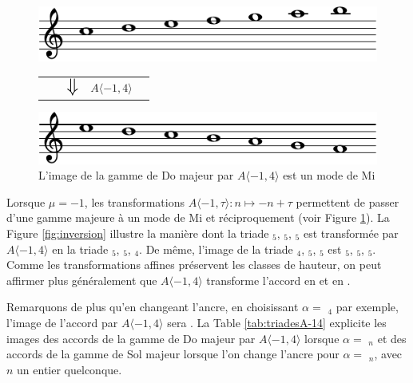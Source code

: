 \begin{figure}
  \includegraphics[width=\columnwidth]{c-maj-crop.pdf}
  \begin{tabularx}{\columnwidth}{ YYYYZ }
    &&$ \mathlarger{\mathlarger{\mathlarger{\mathlarger\Downarrow}}}$ & $A\langle -1,4 \rangle$&
    \end{tabularx}
  \includegraphics[width=\columnwidth]{e-mod-crop.pdf}
  \caption{L'image de la gamme de Do majeur par $A\langle -1,4 \rangle$ est un mode de Mi}
  \label{fig:modeE}
\end{figure}

Lorsque $\mu = -1$, les transformations $A \langle -1,\tau\rangle : n\mapsto -n + \tau$ permettent de passer d'une gamme majeure à un mode de Mi et réciproquement (voir Figure \ref{fig:modeE}). La Figure \ref{fig:inversion} illustre la manière dont la triade $_5$, $_5$, $_5$ est transformée par $A\langle -1,4 \rangle$ en la triade $_5$, $_5$, $_4$. De même, l'image de la triade $_4$, $_5$, $_5$  est  $_5$, $_5$, $_5$. Comme les transformations affines préservent les classes de hauteur, on peut affirmer plus généralement que $A \langle -1,4\rangle$ transforme l'accord  en  et  en . 

Remarquons de plus qu'en changeant l'ancre,  en choisissant $\alpha =$  $_4$ par exemple, l'image de l'accord  par $A\langle-1,4 \rangle$ sera . La Table \ref{tab:triadesA-14} explicite les images des accords de la gamme de Do majeur par $A\langle -1,4 \rangle$ lorsque $\alpha = $ $_n$ et des accords de la gamme de Sol majeur lorsque l'on change l'ancre pour $\alpha =$ $_n$, avec $n$ un entier quelconque.


